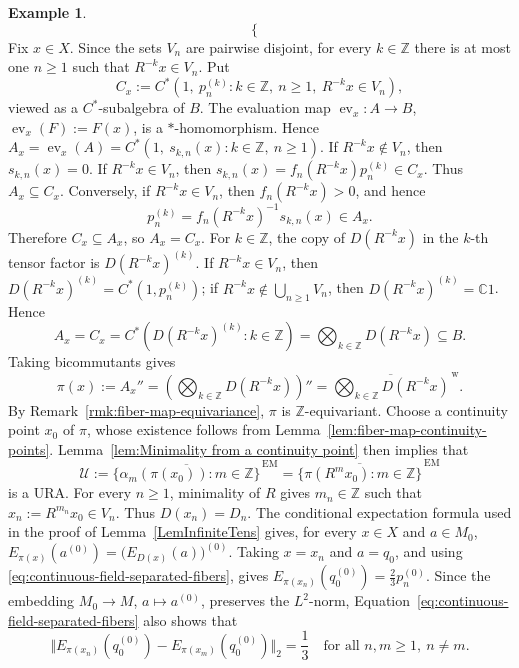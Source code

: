 \documentclass[12pt]{amsart} %
\theoremstyle{plain}
\theoremstyle{definition}
\newtheorem{example}[theorem]{Example}
\begin{document}
\begin{example}
$$\begin{cases}
\end{cases}
$$
Fix $x\in X$. Since the sets $V_n$ are pairwise disjoint, for every
$k\in\mathbb Z$ there is at most one $n\geq1$ such that
$R^{-k}x\in V_n$. Put
$$
C_x:=C^*(1,\ p_n^{(k)}:k\in\mathbb Z,\ n\geq1,\
R^{-k}x\in V_n),
$$
viewed as a $C^*$-subalgebra of $B$. The evaluation map
$\operatorname{ev}_x:A\to B$, $\operatorname{ev}_x(F):=F(x)$, is a
$*$-homomorphism. Hence $A_x=\operatorname{ev}_x(A)
=C^*(1,\ s_{k,n}(x):k\in\mathbb Z,\ n\geq1)$.
If $R^{-k}x\notin V_n$, then $s_{k,n}(x)=0$. If
$R^{-k}x\in V_n$, then
$s_{k,n}(x)=f_n(R^{-k}x)p_n^{(k)}\in C_x$. Thus $A_x\subseteq C_x$.
Conversely, if $R^{-k}x\in V_n$, then $f_n(R^{-k}x)>0$, and hence
$$p_n^{(k)}=f_n(R^{-k}x)^{-1}s_{k,n}(x)\in A_x.$$
Therefore
$C_x\subseteq A_x$, so $A_x=C_x$.
\medskip
\noindent For $k\in\mathbb Z$, the copy of $D(R^{-k}x)$ in the $k$-th
tensor factor is $D(R^{-k}x)^{(k)}$. If $R^{-k}x\in V_n$, then
$D(R^{-k}x)^{(k)}=C^*(1,p_n^{(k)})$; if
$R^{-k}x\notin\bigcup_{n\geq1}V_n$, then
$D(R^{-k}x)^{(k)}=\mathbb C1$. Hence
$$
A_x=C_x=C^*(D(R^{-k}x)^{(k)}:k\in\mathbb Z)
=\bigotimes_{k\in\mathbb Z}D(R^{-k}x)
\subseteq B.
$$
Taking bicommutants gives
\begin{equation}\label{eq:continuous-field-tensor-fiber}
\pi(x):=A_x''
=
\left(\bigotimes_{k\in\mathbb Z}D(R^{-k}x)\right)''
=\overline{\bigotimes_{k\in\mathbb Z}
D(R^{-k}x)}^{\,\mathrm w}.
\end{equation}
\medskip
\noindent
By Remark~\ref{rmk:fiber-map-equivariance}, $\pi$ is
$\mathbb Z$-equivariant. Choose a continuity point $x_0$ of $\pi$,
whose existence follows from
Lemma~\ref{lem:fiber-map-continuity-points}. Lemma~\ref{lem:Minimality from a continuity point}
then implies that
$$
\mathcal U
:=\overline{\{\alpha_m(\pi(x_0)):m\in\mathbb Z\}}^{\,\mathrm{EM}}
=\overline{\{\pi(R^mx_0):m\in\mathbb Z\}}^{\,\mathrm{EM}}
$$
is a URA.
\medskip
\noindent For every $n\geq1$, minimality of $R$ gives
$m_n\in\mathbb Z$ such that $x_n:=R^{m_n}x_0\in V_n$. Thus
$D(x_n)=D_n$. The conditional expectation formula used in the proof of Lemma~\ref{LemInfiniteTens} gives, for every $x\in X$
and $a\in M_0$, $E_{\pi(x)}(a^{(0)})=\bigl(E_{D(x)}(a)\bigr)^{(0)}$. Taking $x=x_n$ and $a=q_0$, and using
\eqref{eq:continuous-field-separated-fibers}, gives
$E_{\pi(x_n)}(q_0^{(0)})=\frac23p_n^{(0)}$.
Since the embedding $M_0\to M$, $a\mapsto a^{(0)}$, preserves the
$L^2$-norm, Equation~\eqref{eq:continuous-field-separated-fibers} also shows that
$$
\Vert
E_{\pi(x_n)}(q_0^{(0)})
-E_{\pi(x_m)}(q_0^{(0)})
\Vert_2
=\frac13
\quad\text{for all }n,m\geq1,\ n\neq m.
$$
\end{example}
\end{document}

